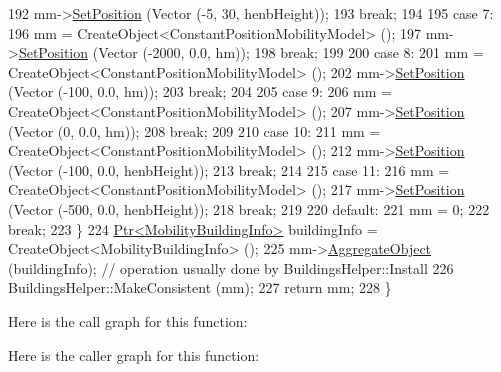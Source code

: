 \begin{DoxyCode}
192       mm->\hyperlink{classns3_1_1MobilityModel_ac584b3d5a309709d2f13ed6ada1e7640}{SetPosition} (Vector (-5, 30, henbHeight));
193       \textcolor{keywordflow}{break};
194 
195     \textcolor{keywordflow}{case} 7:
196       mm = CreateObject<ConstantPositionMobilityModel> ();
197       mm->\hyperlink{classns3_1_1MobilityModel_ac584b3d5a309709d2f13ed6ada1e7640}{SetPosition} (Vector (-2000, 0.0, hm));
198       \textcolor{keywordflow}{break};
199 
200     \textcolor{keywordflow}{case} 8:
201       mm = CreateObject<ConstantPositionMobilityModel> ();
202       mm->\hyperlink{classns3_1_1MobilityModel_ac584b3d5a309709d2f13ed6ada1e7640}{SetPosition} (Vector (-100, 0.0, hm));
203       \textcolor{keywordflow}{break};
204 
205     \textcolor{keywordflow}{case} 9:
206       mm = CreateObject<ConstantPositionMobilityModel> ();
207       mm->\hyperlink{classns3_1_1MobilityModel_ac584b3d5a309709d2f13ed6ada1e7640}{SetPosition} (Vector (0, 0.0, hm));
208       \textcolor{keywordflow}{break};
209 
210     \textcolor{keywordflow}{case} 10:
211       mm = CreateObject<ConstantPositionMobilityModel> ();
212       mm->\hyperlink{classns3_1_1MobilityModel_ac584b3d5a309709d2f13ed6ada1e7640}{SetPosition} (Vector (-100, 0.0, henbHeight));
213       \textcolor{keywordflow}{break};
214 
215     \textcolor{keywordflow}{case} 11:
216       mm = CreateObject<ConstantPositionMobilityModel> ();
217       mm->\hyperlink{classns3_1_1MobilityModel_ac584b3d5a309709d2f13ed6ada1e7640}{SetPosition} (Vector (-500, 0.0, henbHeight));
218       \textcolor{keywordflow}{break};
219 
220     \textcolor{keywordflow}{default}:
221       mm = 0;
222       \textcolor{keywordflow}{break};
223     \}
224   \hyperlink{classns3_1_1Ptr}{Ptr<MobilityBuildingInfo>} buildingInfo = CreateObject<MobilityBuildingInfo> ();
225   mm->\hyperlink{classns3_1_1Object_a79dd435d300f3deca814553f561a2922}{AggregateObject} (buildingInfo); \textcolor{comment}{// operation usually done by BuildingsHelper::Install}
226   BuildingsHelper::MakeConsistent (mm); 
227   \textcolor{keywordflow}{return} mm;
228 \}
\end{DoxyCode}


Here is the call graph for this function\+:




Here is the caller graph for this function\+:


